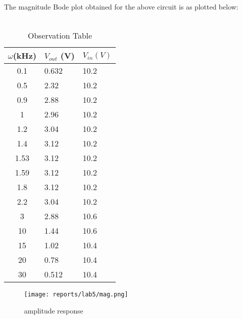 \documentclass[12pt]{article}
\begin{document}
        \noindent
        The magnitude Bode plot obtained for the above circuit is as plotted below:\\\\
        \begin{minipage}{\linewidth}
            \centering
            \begin{minipage}{0.4\linewidth}
                \begin{table}[H]
                    \centering
                    \begin{tabular}{|c|l|l|}
                    \hline
                        $\omega$(kHz) &$V_{out}$ (V)&$V_{in} (V)$\\ \hline
                        0.1	&	0.632	&	10.2	\\	\hline
                        0.5	&	2.32	&	10.2	\\	\hline
                        0.9	&	2.88	&	10.2	\\	\hline
                        1	&	2.96	&	10.2	\\	\hline
                        1.2	&	3.04	&	10.2	\\	\hline
                        1.4	&	3.12	&	10.2	\\	\hline
                        1.53	&	3.12	&	10.2	\\	\hline
                        1.59	&	3.12	&	10.2	\\	\hline
                        1.8	&	3.12	&	10.2	\\	\hline
                        2.2	&	3.04	&	10.2	\\	\hline
                        3	&	2.88	&	10.6	\\	\hline
                        10	&	1.44	&	10.6	\\	\hline
                        15	&	1.02	&	10.4	\\	\hline
                        20	&	0.78	&	10.4	\\	\hline
                        30	&	0.512	&	10.4	\\	\hline
                    \end{tabular}
                    \caption{Observation Table}
                    \label{tab:my_label}
                \end{table}
            \end{minipage}
            \hspace{0.02\linewidth}
            \begin{minipage}{0.56\linewidth}
                \begin{figure}[H]
                    \texttt{[image: reports/lab5/mag.png]}
                    \caption{amplitude response}
                    \label{Va_0_yt}
                \end{figure}
            \end{minipage}
        \end{minipage}
\end{document}
